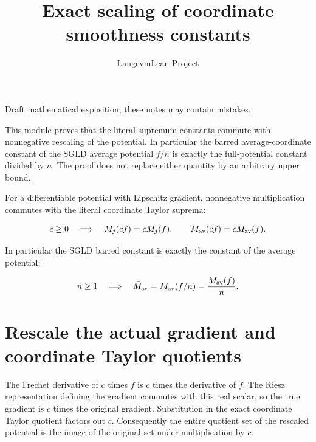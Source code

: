 \documentclass[11pt,a4paper]{article}
\title{\texorpdfstring{Exact scaling of coordinate smoothness constants}{Exact scaling of coordinate smoothness constants}}
\author{LangevinLean Project}
\date{}
\begin{document}
\maketitle
Draft mathematical exposition; these notes may contain mistakes.


This module proves that the literal supremum constants commute with nonnegative rescaling of the potential. In particular the barred average-coordinate constant of the SGLD average potential \(f/n\) is exactly the full-potential constant divided by \(n\). The proof does not replace either quantity by an arbitrary upper bound.



For a differentiable potential with Lipschitz gradient, nonnegative multiplication commutes with the literal coordinate Taylor suprema:

\[c\ge0\quad\Longrightarrow\quad M_j(cf)=cM_j(f),\qquad M_{\rm av}(cf)=cM_{\rm av}(f).\]

In particular the SGLD barred constant is exactly the constant of the average potential:

\[n\ge1\quad\Longrightarrow\quad \bar M_{\rm av}=M_{\rm av}(f/n)=\frac{M_{\rm av}(f)}{n}.\]
\section{\texorpdfstring{Rescale the actual gradient and coordinate Taylor quotients}{Rescale the actual gradient and coordinate Taylor quotients}}


The Frechet derivative of \(c\) times \(f\) is \(c\) times the derivative of \(f\). The Riesz representation defining the gradient commutes with this real scalar, so the true gradient is \(c\) times the original gradient. Substitution in the exact coordinate Taylor quotient factors out \(c\). Consequently the entire quotient set of the rescaled potential is the image of the original set under multiplication by \(c\).
\end{document}
